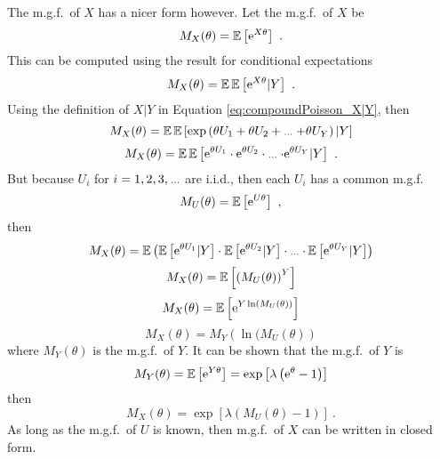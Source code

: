 The m.g.f.~of $X$ has a nicer form however. Let the m.g.f.~of $X$ be
\begin{equation*}
	M_X(\theta)=\operatorname{\mathbb{E}}\left[\mathrm{e}^{X\theta}\right]
	\ .
\end{equation*}
This can be computed using the result for conditional expectations
\begin{equation*}
	M_X(\theta)=\operatorname{\mathbb{E}}\operatorname{\mathbb{E}}\left[\mathrm{e}^{X\theta}|Y\right]
	\ .
\end{equation*}
Using the definition of $X|Y$ in Equation \eqref{eq:compoundPoisson_X|Y}, then
\begin{equation*}
	M_X(\theta)=\expectation\expectation\left[\exp\left(\theta U_1 + \theta U_2 + \dotdotdot + \theta U_Y\right)|Y\right]
\end{equation*}
\begin{equation*}
	M_X(\theta)=\expectation\expectation\left[\euler^{\theta U_1}\cdot\euler^{\theta U_2}\cdot\dotdotdot\cdot\euler^{\theta U_Y}|Y\right]
	\ .
\end{equation*}
But because $U_i$ for $i=1,2,3,\dotdotdot$ are i.i.d., then each $U_i$ has a common m.g.f.
\begin{equation*}
	M_U(\theta)=\operatorname{\mathbb{E}}\left[\mathrm{e}^{U\theta}\right]
	\ ,
\end{equation*}
then
\begin{equation*}
	M_X(\theta)=\expectation\left(
		\expectation\left[\euler^{\theta U_1}|Y\right]\cdot
		\expectation\left[\euler^{\theta U_2}|Y\right]\cdot
		\dotdotdot \cdot
		\expectation\left[\euler^{\theta U_Y}|Y\right]
	\right)
\end{equation*}
\begin{equation*}
	M_X(\theta)=\operatorname{\mathbb{E}}\left[\left(M_U(\theta)\right)^Y\right]
\end{equation*}
\begin{equation*}
	M_X(\theta)=\operatorname{\mathbb{E}}\left[\mathrm{e}^{Y\ln(M_U(\theta))}\right]
\end{equation*}
\begin{equation*}
	M_X(\theta) = M_Y\left(\ln(M_U(\theta)\right)
\end{equation*}
where $M_Y(\theta)$ is the m.g.f.~of $Y$. It can be shown that the m.g.f.~of $Y$ is
\begin{equation}
	M_Y(\theta)=\operatorname{\mathbb{E}}\left[\mathrm{e}^{Y\theta}\right]=
	\exp
	\left[
		\lambda
		\left(
		  \mathrm{e}^\theta-1
		\right)
	\right]
\end{equation}
then
\begin{equation}
	M_X(\theta)=
	\exp\left[
		\lambda
		\left(
			M_U(\theta)-1
		\right)
	\right]
	\ .
\end{equation}
As long as the m.g.f.~of $U$ is known, then m.g.f.~of $X$ can be written in closed form.

